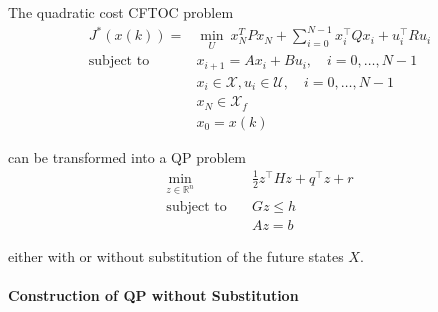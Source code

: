 \newpar{}

The quadratic cost CFTOC problem
\begin{align*}
    J^*(x(k)) =            & \min_U \: x_N^T P x_N + \sum_{i=0}^{N-1}x_i^\top Q x_i + u_i^\top R u_i \\
    \text{subject to}\quad & x_{i+1} = Ax_i +Bu_i, \quad i = 0, \ldots, N-1                          \\
                           & x_i \in \mathcal{X}, u_i \in \mathcal{U}, \quad i = 0, \ldots, N-1      \\
                           & x_N \in \mathcal{X}_f                                                   \\
                           & x_0 = x(k)
\end{align*}

can be transformed into a QP problem
\begin{align*}
    \min_{z\in\mathbb{R}^n} & \frac{1}{2}z^\top Hz + q^\top z + r \\
    \text{subject to}\quad  & Gz \leq h                           \\
                            & Az = b
\end{align*}

either with or without substitution of the future states $X$.

\paragraph{Construction of QP without Substitution}

